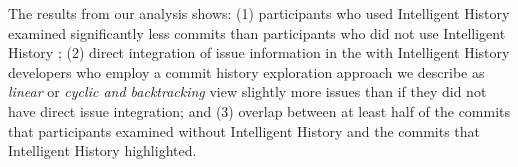 The results from our analysis shows:
(1) participants who used Intelligent History examined significantly
less commits than participants who did not use Intelligent History
;
(2) direct integration of issue information in the 
with Intelligent History  developers who employ a commit history exploration approach
we describe as \textit{linear} or \textit{cyclic and backtracking}  view slightly more issues than if they did not have
direct issue integration; and
(3)  overlap between at least half of the commits
that participants examined without Intelligent History and the commits that Intelligent History
highlighted.

